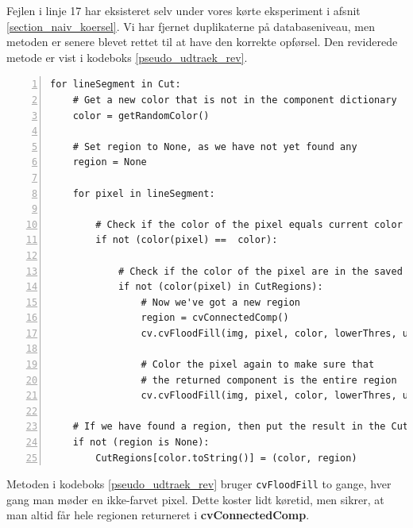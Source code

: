 {Fejlen i linje 17 har eksisteret selv under vores kørte eksperiment i
afsnit \ref{section_naiv_koersel}.  Vi har fjernet duplikaterne på
databaseniveau, men metoden er senere blevet rettet til at have den
korrekte opførsel. Den reviderede metode er vist i kodeboks
\ref{pseudo_udtraek_rev}.

\begin{lstlisting}[caption={Revideret pseudokode til udtrækning af
    regioner. Returnerer ingen
    duplikater.},captionpos=b,label={pseudo_udtraek_rev},numbers=left,
    frame=tb, breaklines=false, float=h]
for lineSegment in Cut:
    # Get a new color that is not in the component dictionary
    color = getRandomColor()

    # Set region to None, as we have not yet found any
    region = None

    for pixel in lineSegment:

        # Check if the color of the pixel equals current color
        if not (color(pixel) ==  color):

            # Check if the color of the pixel are in the saved regions
            if not (color(pixel) in CutRegions):
                # Now we've got a new region
                region = cvConnectedComp()
                cv.cvFloodFill(img, pixel, color, lowerThres, upperThres, region)

                # Color the pixel again to make sure that
                # the returned component is the entire region
                cv.cvFloodFill(img, pixel, color, lowerThres, upperThres, region)

    # If we have found a region, then put the result in the CutRegions-dictionary
    if not (region is None):
        CutRegions[color.toString()] = (color, region)
\end{lstlisting}

Metoden i kodeboks \ref{pseudo_udtraek_rev} bruger \texttt{cvFloodFill}
to gange, hver gang man møder en ikke-farvet pixel. Dette koster lidt
køretid, men sikrer, at man altid får hele regionen returneret i
\textbf{cvConnectedComp}.


}
